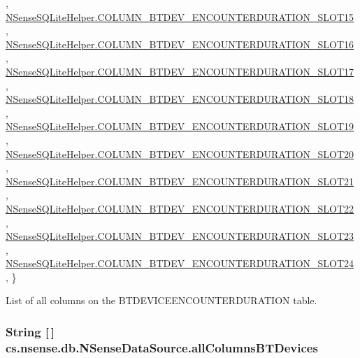 \begin{DoxyCode}
      ,
            \hyperlink{classcs_1_1nsense_1_1db_1_1_n_sense_s_q_lite_helper_abeaba69baab42467bc450b18a4b3e26c}{NSenseSQLiteHelper.COLUMN\_BTDEV\_ENCOUNTERDURATION\_SLOT15}
      ,
            \hyperlink{classcs_1_1nsense_1_1db_1_1_n_sense_s_q_lite_helper_aa8de31531131eda77bf5db18f65c9e7b}{NSenseSQLiteHelper.COLUMN\_BTDEV\_ENCOUNTERDURATION\_SLOT16}
      ,
            \hyperlink{classcs_1_1nsense_1_1db_1_1_n_sense_s_q_lite_helper_ac55647f62ad55ab96661fabe27156787}{NSenseSQLiteHelper.COLUMN\_BTDEV\_ENCOUNTERDURATION\_SLOT17}
      ,
            \hyperlink{classcs_1_1nsense_1_1db_1_1_n_sense_s_q_lite_helper_af0b40f941b35daa7a86daf53697994db}{NSenseSQLiteHelper.COLUMN\_BTDEV\_ENCOUNTERDURATION\_SLOT18}
      ,
            \hyperlink{classcs_1_1nsense_1_1db_1_1_n_sense_s_q_lite_helper_a3af10883de8b80b461d36dae12812b70}{NSenseSQLiteHelper.COLUMN\_BTDEV\_ENCOUNTERDURATION\_SLOT19}
      ,
            \hyperlink{classcs_1_1nsense_1_1db_1_1_n_sense_s_q_lite_helper_af0783690cdda0a868a44c913c2bc4ccd}{NSenseSQLiteHelper.COLUMN\_BTDEV\_ENCOUNTERDURATION\_SLOT20}
      ,
            \hyperlink{classcs_1_1nsense_1_1db_1_1_n_sense_s_q_lite_helper_aeeb83cf96db1205867782917cb28fae3}{NSenseSQLiteHelper.COLUMN\_BTDEV\_ENCOUNTERDURATION\_SLOT21}
      ,
            \hyperlink{classcs_1_1nsense_1_1db_1_1_n_sense_s_q_lite_helper_a0465b5a08fa1199b51f892c714de80a8}{NSenseSQLiteHelper.COLUMN\_BTDEV\_ENCOUNTERDURATION\_SLOT22}
      ,
            \hyperlink{classcs_1_1nsense_1_1db_1_1_n_sense_s_q_lite_helper_aa19cb38e6c45606cd6e7a28c8938c7d6}{NSenseSQLiteHelper.COLUMN\_BTDEV\_ENCOUNTERDURATION\_SLOT23}
      ,
            \hyperlink{classcs_1_1nsense_1_1db_1_1_n_sense_s_q_lite_helper_a42c8ca8db6aa3f3d7b59f188a4387d9c}{NSenseSQLiteHelper.COLUMN\_BTDEV\_ENCOUNTERDURATION\_SLOT24}
      ,
    \}
\end{DoxyCode}
List of all columns on the B\-T\-D\-E\-V\-I\-C\-E\-E\-N\-C\-O\-U\-N\-T\-E\-R\-D\-U\-R\-A\-T\-I\-O\-N table. \hypertarget{classcs_1_1nsense_1_1db_1_1_n_sense_data_source_a765fd3575a38201aa7b33b6b9f2d9272}{
\subsubsection[{all\-Columns\-B\-T\-Devices}]{\setlength{\rightskip}{0pt plus 5cm}String \mbox{[}$\,$\mbox{]} cs.\-nsense.\-db.\-N\-Sense\-Data\-Source.\-all\-Columns\-B\-T\-Devices\hspace{0.3cm}{\ttfamily [private]}}}\label{classcs_1_1nsense_1_1db_1_1_n_sense_data_source_a765fd3575a38201aa7b33b6b9f2d9272}
